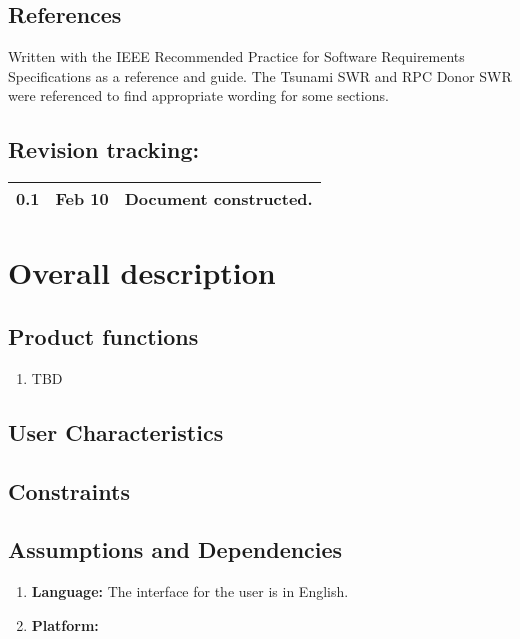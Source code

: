 \documentclass[12pt]{article}
\begin{document}
\subsection{References}
Written with the IEEE Recommended Practice for Software Requirements Specifications as a reference and guide. The Tsunami SWR and RPC Donor SWR were referenced to find appropriate wording for some sections.

\subsection{Revision tracking:}
\begin{tabular}{|l|r|p{5in}|}
\hline
0.1 & Feb 10 & Document constructed.\\
\hline
\end{tabular}

\section{Overall description}
\subsection{Product functions}


\begin{enumerate}
\item TBD
\end{enumerate}

\subsection{User Characteristics}


\subsection{Constraints}

\subsection{Assumptions and Dependencies}
\begin{enumerate}
\item \textbf{Language:} The interface for the user is in English.
\item \textbf{Platform:} 
\end{enumerate}
\end{document}
